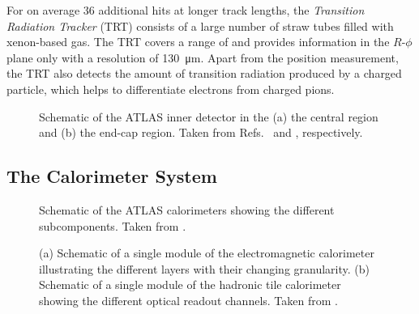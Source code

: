 For on average 36 additional hits at longer track lengths, the \emph{Transition Radiation Tracker} (TRT) consists of a large number of straw tubes filled with xenon-based gas. The TRT covers a range of  and provides information in the $R$-$\phi$ plane only with a resolution of \SI{130}{\micro\meter}.
Apart from the position measurement, the TRT also detects the amount of transition radiation produced by a charged particle, which helps to differentiate electrons from charged pions.

\begin{figure}
    \caption{Schematic of the ATLAS inner detector in the (a) the central region and (b) the end-cap region. Taken from Refs.~\cite{ATL-PHYS-PUB-2015-009} and \cite{PERF-2007-01}, respectively.}
    \label{fig:ATLASinnerdetector}
\end{figure}


\subsection{The Calorimeter System}
\begin{figure}
    \caption[Schematic of the ATLAS calorimeters showing the different subcomponents.]{Schematic of the ATLAS calorimeters showing the different subcomponents. Taken from .}
    \label{fig:ATLAScalorimeters}
\end{figure}

\begin{figure}
    \caption{(a) Schematic of a single module of the electromagnetic calorimeter illustrating the different layers with their changing granularity. (b) Schematic of a single module of the hadronic tile calorimeter showing the different optical readout channels. Taken from .}
    \label{fig:ATLASmodules}
\end{figure}


